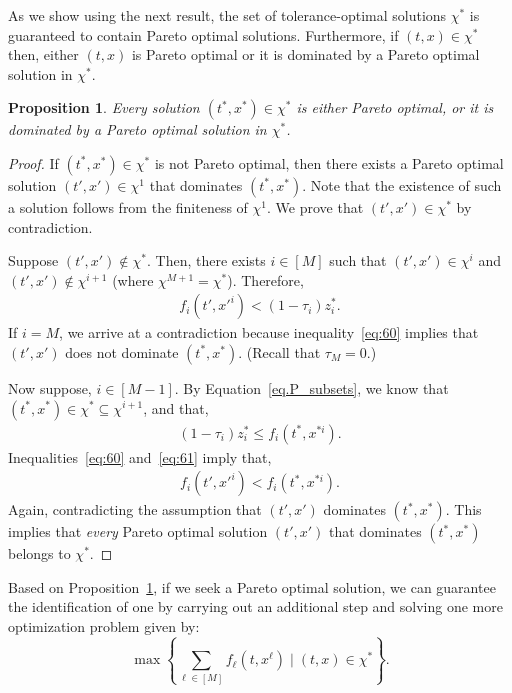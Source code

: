 \documentclass[12pt, a4paper, bibliography=totoc]{scrartcl}
\newtheorem{proposition}{Proposition}
\begin{document}
As we show using the next result, the set of tolerance-optimal solutions $\chi^*$ is guaranteed to contain Pareto optimal solutions. Furthermore, if $(t,x)\in \chi^*$ then, either $(t,x)$ is Pareto optimal  or it is dominated by a Pareto optimal solution in $\chi^*$.


\begin{proposition}\label{prop.P_dominant}
Every solution $(t^*,x^*) \in \chi^*$ is either  Pareto optimal, or it is dominated by a Pareto optimal solution in $\chi^*$.
\end{proposition}

\begin{proof}
If $(t^*,x^*) \in \chi^*$ is not  Pareto optimal, then there exists a Pareto optimal solution $(t',x') \in \chi^1$  that  dominates $(t^*,x^*)$. Note that the existence of such a solution follows from the finiteness of $\chi^1$. We prove that $(t',x') \in \chi^*$ by contradiction.

Suppose $(t',x') \notin \chi^*$. Then, there exists $i \in [M]$ such that $(t',x') \in \chi^i$ and $(t',x') \notin \chi^{i+1}$ (where $\chi^{M+1}=\chi^*$). Therefore, 
\begin{align} \label{eq:60}
    f_{i}(t',x'^i) < (1-\tau_{i})z^*_{i}.
\end{align}
If $i=M$, we arrive at a contradiction   because inequality~\eqref{eq:60} implies that $(t',x')$ does not dominate $(t^*,x^*)$. (Recall that $\tau_M = 0$.)

Now suppose, $i \in [M-1]$. By Equation~\eqref{eq.P_subsets}, we know that $(t^*,x^*) \in \chi^* \subseteq \chi^{i+1}$, and that, 
\begin{align} \label{eq:61}
    (1-\tau_{i})z^*_{i} \leq f_{i}(t^*,x^{*i}).
\end{align}
Inequalities~\eqref{eq:60} and~\eqref{eq:61} imply that, 
\begin{align} \label{eq:62}
    f_{i}(t',x'^i) < f_{i}(t^*,x^{*i}).
\end{align}
Again, contradicting the assumption that $(t',x')$ dominates $(t^*,x^*)$. This implies that \textit{every} Pareto optimal solution $(t',x')$ that dominates $(t^*,x^*)$ belongs to $\chi^*$.
\end{proof}

Based on Proposition~\ref{prop.P_dominant}, if we seek a Pareto optimal solution, we can guarantee the identification of one by carrying out an additional step and solving one more optimization problem given by: \[
\max\left\{\sum_{\ell \in [M]}f_\ell(t,x^\ell) \mid (t,x) \in \chi^*\right\}.
\]
\end{document}
